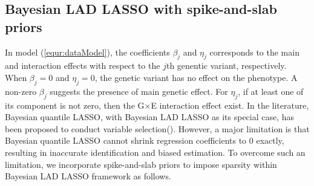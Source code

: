 \documentclass[12pt]{article}
\begin{document}
\subsection{Bayesian LAD LASSO with spike-and-slab priors}

In model (\ref{equr:dataModel}), the coefficients $\beta_{j}$ and $\eta_{j}$ corresponds to the main and interaction effects with respect to the $j$th genentic variant, respectively. When $\beta_{j} = 0$ and $\eta_{j} = 0$,  the genetic variant has no effect on the phenotype. A non-zero $\beta_{j}$ suggests the presence of main genetic effect. For $\eta_{j}$, if at least one of its component is not zero, then the G$\times$E interaction effect exist. In the literature, Bayesian quantile LASSO, with Bayesian LAD LASSO as its special case, has been proposed to conduct variable selection(\cite{NANLIN}). However, a major limitation is that Bayesian quantile LASSO cannot shrink regression coefficients to 0 exactly, resulting in inaccurate identification and biased estimation. To overcome such an limitation, we incorporate spike-and-slab priors to impose sparsity within Bayesian LAD LASSO framework as follows. 
\end{document}
